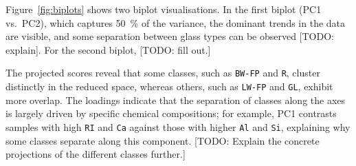 \documentclass[dtu]{dtuarticle}
\newcommand{\todo}[1]{\color{red}[TODO: #1]\color{black}}
\begin{document}
	Figure~\ref{fig:biplots} shows two biplot visualisations. In the first biplot (PC1 vs.\ PC2), which captures \SI{50}{\percent} of the variance, the dominant trends in the data are visible, and some separation between glass types can be observed \todo{explain}. For the second biplot, \todo{fill out.}

	The projected scores reveal that some classes, such as \texttt{BW-FP} and \texttt{R}, cluster distinctly in the reduced space, whereas others, such as \texttt{LW-FP} and \texttt{GL}, exhibit more overlap. The loadings indicate that the separation of classes along the axes is largely driven by specific chemical compositions; for example, PC1 contrasts samples with high \texttt{RI} and \texttt{Ca} against those with higher \texttt{Al} and \texttt{Si}, explaining why some classes separate along this component. \todo{Explain the concrete projections of the different classes further.}
\end{document}
